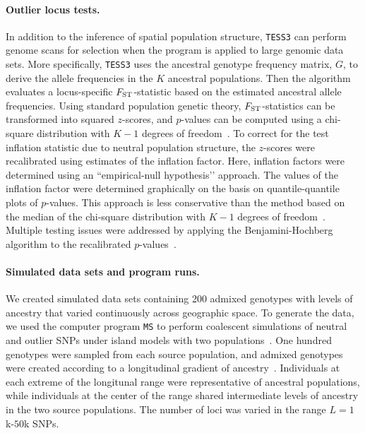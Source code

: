 \paragraph{Outlier locus tests.} 

In addition to the inference of spatial population structure, {\tt TESS3} can perform genome scans for selection when the program is applied to large genomic data sets. More specifically, {\tt TESS3} uses the ancestral genotype frequency matrix, $G$, to derive the allele frequencies in the $K$ ancestral populations. Then the algorithm evaluates a locus-specific $F_{\rm ST}$-statistic based on the estimated ancestral allele frequencies. Using standard population genetic theory, $F_{\rm ST}$-statistics can be transformed into squared $z$-scores, and $p$-values can be computed using a chi-square distribution with $K-1$ degrees of freedom~\citep{weir1990genetic}. To correct for the test inflation statistic due to neutral population structure, the $z$-scores were recalibrated using estimates of the inflation factor. Here, inflation factors were determined using an ``empirical-null hypothesis\rq\rq{} approach. The values of the inflation factor were determined graphically on the basis on quantile-quantile plots of $p$-values. This approach is less conservative than the method based on the median of the chi-square distribution with $K-1$ degrees of freedom~\citep{devlin1999genomic, frichot2015lea}. Multiple testing issues were addressed by applying the Benjamini-Hochberg algorithm to the recalibrated $p$-values~\citep{benjamini1995controlling}.  

\paragraph{Simulated data sets and program runs.} 


We created simulated data sets containing 200 admixed genotypes with levels of ancestry that varied continuously across geographic space. To generate the data,  we used the computer program {\tt MS} to perform coalescent simulations of neutral and outlier SNPs under island models with two populations~\citep{hudson2002generating}. One hundred genotypes were sampled from each source population, and admixed genotypes were created according to a longitudinal gradient of ancestry~\citep{durand2009spatial,franccois2010spatially}. Individuals at each extreme of the longitunal range were representative of ancestral populations, while individuals at the center of the range shared intermediate levels of ancestry in the two source populations. The number of loci was varied in the range $L = 1$k-$50$k SNPs.

